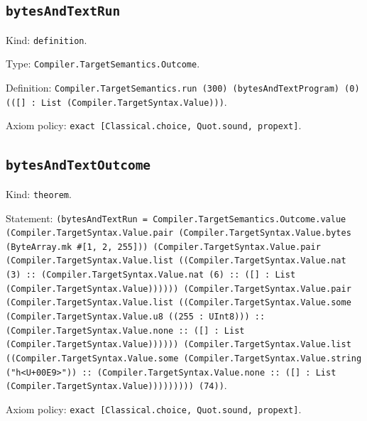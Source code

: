 \documentclass[11pt]{article}
\begin{document}
\subsection*{\texttt{bytesAndTextRun}}
\noindent Kind: \texttt{definition}.\par
\noindent Type: \texttt{Compiler.TargetSemantics.Outcome}.\par
\noindent Definition: \texttt{Compiler.TargetSemantics.run (300) (bytesAndTextProgram) (0) (([] : List (Compiler.TargetSyntax.Value)))}.\par
\noindent Axiom policy: \texttt{exact [Classical.choice, Quot.sound, propext]}.\par
\subsection*{\texttt{bytesAndTextOutcome}}
\noindent Kind: \texttt{theorem}.\par
\noindent Statement: \texttt{(bytesAndTextRun = Compiler.TargetSemantics.Outcome.value (Compiler.TargetSyntax.Value.pair (Compiler.TargetSyntax.Value.bytes (ByteArray.mk \#[1, 2, 255])) (Compiler.TargetSyntax.Value.pair (Compiler.TargetSyntax.Value.list ((Compiler.TargetSyntax.Value.nat (3) :: (Compiler.TargetSyntax.Value.nat (6) :: ([] : List (Compiler.TargetSyntax.Value)))))) (Compiler.TargetSyntax.Value.pair (Compiler.TargetSyntax.Value.list ((Compiler.TargetSyntax.Value.some (Compiler.TargetSyntax.Value.u8 ((255 : UInt8))) :: (Compiler.TargetSyntax.Value.none :: ([] : List (Compiler.TargetSyntax.Value)))))) (Compiler.TargetSyntax.Value.list ((Compiler.TargetSyntax.Value.some (Compiler.TargetSyntax.Value.string ("h<U+00E9>")) :: (Compiler.TargetSyntax.Value.none :: ([] : List (Compiler.TargetSyntax.Value))))))))) (74))}.\par
\noindent Axiom policy: \texttt{exact [Classical.choice, Quot.sound, propext]}.\par
\end{document}
